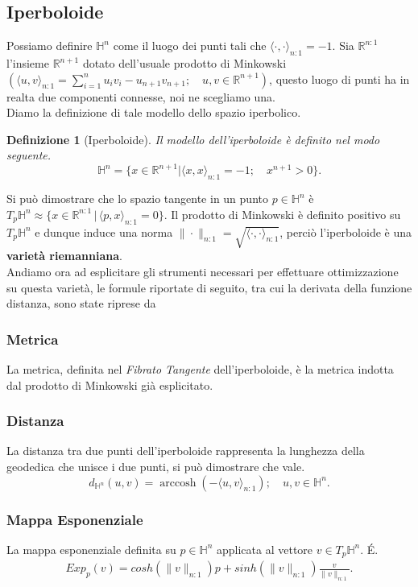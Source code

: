 \documentclass[a4paper, 12pt]{article}
\newtheorem{definition}{Definizione}
\DeclareMathOperator\arccosh{arccosh}
\begin{document}
\subsection{Iperboloide}
Possiamo definire $\mathbb{H}^n$ come il luogo dei punti tali che $\langle \cdot, \cdot \rangle_{n:1} = -1$. Sia $\mathbb{R}^{n:1}$ l'insieme $\mathbb{R}^{n+1}$ dotato dell'usuale prodotto di Minkowski $(\langle u, v \rangle_{n:1} = \sum_{i=1}^{n} u_iv_i - u_{n+1}v_{n+1}; \quad u,v \in \mathbb{R}^{n+1})$, questo luogo di punti ha in realta due componenti connesse, noi ne scegliamo una.\\
Diamo la definizione di tale modello dello spazio iperbolico.
\begin{definition}[Iperboloide]
Il modello dell'iperboloide è definito nel modo seguente.\\
\[\mathbb{H}^n = \{x \in \mathbb{R}^{n+1} | \langle x, x \rangle_{n:1} = -1; \quad x^{n+1} > 0 \}.\]
\end{definition}
Si può dimostrare che lo spazio tangente in un punto $p \in \mathbb{H}^n$ è $T_p\mathbb{H}^n \approx \{x \in \mathbb{R}^{n:1} \, | \, \langle p,x \rangle_{n:1} = 0\}$. Il prodotto di Minkowski è definito positivo su $T_p\mathbb{H}^n$ e dunque induce una norma $\| \cdot \|_{n:1} = \sqrt{\langle \cdot, \cdot \rangle_{n:1}}$, perciò l'iperboloide è una \textbf{varietà riemanniana}.\\
Andiamo ora ad esplicitare gli strumenti necessari per effettuare ottimizzazione su questa varietà, le formule riportate di seguito, tra cui la derivata della funzione distanza, sono state riprese da \cite{Wilson}
\subsubsection{Metrica}
La metrica, definita nel \textit{Fibrato Tangente} dell'iperboloide, è la metrica indotta dal prodotto di Minkowski già esplicitato.
\subsubsection{Distanza}
La distanza tra due punti dell'iperboloide rappresenta la lunghezza della geodedica che unisce i due punti, si può dimostrare che vale.\\
\[d_{\mathbb{H}^n} (u,v) = \arccosh (-\langle u, v \rangle_{n:1}); \quad u,v \in \mathbb{H}^n.\]
\subsubsection{Mappa Esponenziale}
La mappa esponenziale definita su $p \in \mathbb{H}^n$ applicata al vettore $v \in T_p\mathbb{H}^n$. \'E.\\
\begin{equation*}\begin{gathered}
Exp_p(v) = cosh(\| v \|_{n:1})p + sinh(\| v \|_{n:1}) \frac{v}{\| v \|_{n:1}}.
\end{gathered}\end{equation*}
\end{document}
